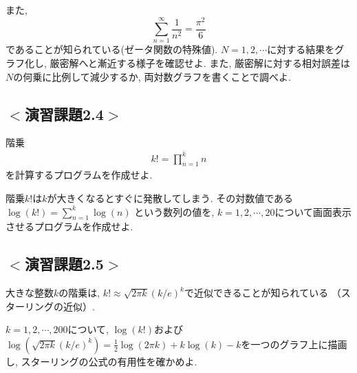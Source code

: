 また, 
\begin{equation}
\sum_{n=1}^{\infty} \frac{1}{n^2}=\frac{\pi^2}{6}
\end{equation}
であることが知られている(ゼータ関数の特殊値). 
$N=1, 2, \cdots$に対する結果をグラフ化し, 厳密解へと漸近する様子を確認せよ. 
また, 厳密解に対する相対誤差は$N$の何乗に比例して減少するか, 両対数グラフを書くことで調べよ. 

\subsection*{$<$演習課題2.4$>$}
階乗
\begin{eqnarray}
k! = \prod_{n=1}^{k} n
\end{eqnarray}
を計算するプログラムを作成せよ. 

階乗$k!$は$k$が大きくなるとすぐに発散してしまう. 
その対数値である$\log(k!) = \sum_{n=1}^{k} \log(n)$ という数列の値を, 
$k=1,2, \cdots, 20$について画面表示させるプログラムを作成せよ. \\
\newline




\subsection*{$<$演習課題2.5$>$}
大きな整数$k$の階乗は, $k!\approx \sqrt{2\pi k}\left(k/e\right)^k$で近似できることが知られている
（スターリングの近似）. 

$k=1,2, \cdots, 200$について, $\log(k!)$および$\log(\sqrt{2\pi k}\left(k/e\right)^k)=\frac{1}{2}\log(2\pi k) + k\log(k)-k$を一つのグラフ上に描画し, 
スターリングの公式の有用性を確かめよ. 
\newline
